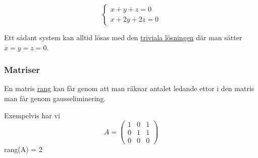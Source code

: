 \documentclass[../main.tex]{subfiles}
\begin{document}
$$
\begin{cases}
x + y + z = 0\\
x + 2y +2 z = 0
\end{cases}
$$

Ett sådant system kan alltid lösas med den \underline{triviala lösningen} där man sätter $x = y = z = 0$.

\subsubsection{Matriser}
\begin{definition}
\label{matrisrang}
En matris \underline{rang} kan får genom att man räknar antalet ledande ettor i den matris man får genom gausseliminering.

Exempelvis har vi
$$A = \begin{pmatrix}
1 & 0 & 1\\
0 & 1 & 1\\
0 & 0 & 0
\end{pmatrix}$$
rang(A) = 2
\end{definition}
\end{document}
